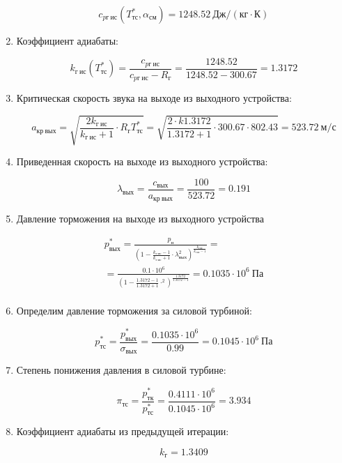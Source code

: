 \documentclass[a4paper,12pt]{article}
\begin{document}
\begin{enumerate}
	\[ c_{pг\ ис} (T_{тс}^*, \alpha_{см}) = 1248.52\ Дж/ (кг \cdot К) \]
	
	\item Коэффициент адиабаты:
	
	\[
	k_{г\ ис} (T_{тс}^*)  = \frac{ c_{pг\ ис} }{ c_{pг\ ис} - R_г } = 
			\frac{ 1248.52 }{ 1248.52 - 300.67 } = 
			1.3172
	\]

	\item Критическая скорость звука на выходе из выходного устройства:

	\[
		a_{кр\ вых} = \sqrt{\frac{2 k_{г\ ис}}{k_{г\ ис} + 1} \cdot R_г T_{тс}^* } =
		\sqrt{
			\frac{2 \cdot k1.3172
			}{
			1.3172 + 1} \cdot
			300.67 \cdot 802.43
		} =
		523.72\ м/с
	\]

	\item Приведенная скорость на выходе из выходного устройства:

	\[
		\lambda_{вых} = \frac{c_{вых}}{a_{кр\ вых}} =
			\frac{100}{523.72} =
		0.191
	\]

	\item Давление торможения на выходе из выходного устройства
	
	\begin{gather*}
	    p_{вых}^* = \frac{ p_н
				}{
					\left(
						1 - \frac{ k_{г\ ис} - 1 }{ k_{г\ ис} + 1 } \cdot \lambda_{вых} ^ 2
					\right)
						^ {
							\frac{ k_{г\ ис} }{ k_{г\ ис} - 1 }
						}
				} =\\
	    = \frac{ 0.1 \cdot 10^6
		}{
			\left(
				1 - \frac{ 1.3172 - 1 }{ 1.3172 + 1 } \cdot  ^ 2
			\right)
				^ {
					\frac{ 1.3172 }{ 1.3172 - 1 }
				}
				} =
		0.1035 \cdot 10^6\ Па\\
	\end{gather*}
	
	\item Определим давление торможения за силовой турбиной:
	
	\[
	p_{тс}^* = \frac{ p_{вых}^* }{ \sigma_{вых} } = \frac{ 0.1035 \cdot 10^6 }{ 0.99 } =
			0.1045 \cdot 10^6\ Па
	\]

	\item Степень понижения давления в силовой турбине:
	
	\[ \pi_{тс} = \frac{ p_{тк}^* }{ p_{тс}^* } =
			\frac{ 
				0.4111 \cdot 10^6 
			}{ 
				0.1045 \cdot 10^6 
			} = 
			3.934
	\]
	
	\item Коэффициент адиабаты из предыдущей итерации:
	
	\[ k_г = 1.3409 \]
	

\end{enumerate}
\end{document}
